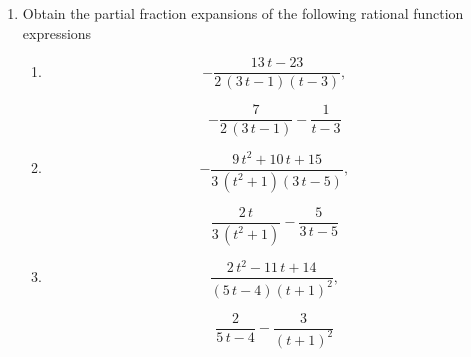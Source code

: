 \documentclass[oneside,10pt]{memoir}
\newcounter{pass}
\begin{document}
\begin{enumerate}
\setcounter{enumi}{\value{pass}}
\item
Obtain the partial fraction expansions of the following rational function expressions
\begin{enumerate}
\item
$$-\frac{13 \, t - 23}{2 \, {\left(3 \, t - 1\right)} {\left(t - 3\right)}},$$
\begin{solution}
$$-\frac{7}{2 \, {\left(3 \, t - 1\right)}} - \frac{1}{t - 3}$$
\end{solution}
\item
$$-\frac{9 \, t^{2} + 10 \, t + 15}{3 \, {\left(t^{2} + 1\right)} {\left(3 \, t - 5\right)}},$$
\begin{solution}
$$\frac{2 \, t}{3 \, {\left(t^{2} + 1\right)}} - \frac{5}{3 \, t - 5}$$
\end{solution}
\item
$$\frac{2 \, t^{2} - 11 \, t + 14}{{\left(5 \, t - 4\right)} {\left(t + 1\right)}^{2}},$$
\begin{solution}
$$\frac{2}{5 \, t - 4} - \frac{3}{{\left(t + 1\right)}^{2}}$$
\end{solution}
\end{enumerate}
\end{enumerate}
\end{document}
